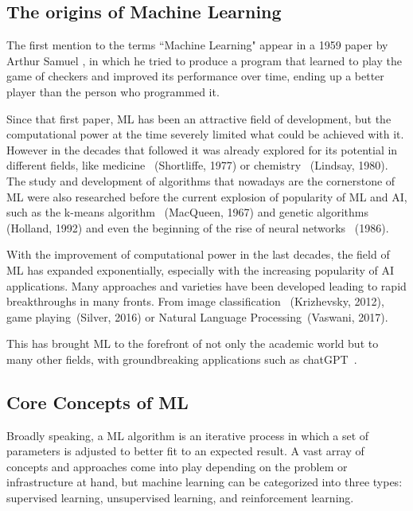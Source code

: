 \documentclass[a4paper, 11pt]{report}
\begin{document}
\subsection{The origins of Machine Learning} \label{Theory: ML}
The first mention to the terms ``Machine Learning" appear in a 1959 paper by Arthur Samuel \cite{samuel1969_ML_origin}, in which he tried to produce a program that learned to play the game of checkers and improved its performance over time, ending up a better player than the person who programmed it.

Since that first paper, ML has been an attractive field of development, but the computational power at the time severely limited what could be achieved with it. However in the decades that followed it was already explored for its potential in different fields, like medicine~\cite{Shortliffe1977_ML_medicine} (Shortliffe, 1977) or chemistry~\cite{Lindsay1980_ML_chemistry80} (Lindsay, 1980). The study and development of algorithms that nowadays are the cornerstone of ML were also researched before the current explosion of popularity of ML and AI, such as the k-means algorithm~\cite{MacQueen1967_Methods_Multivariate} (MacQueen, 1967) and genetic algorithms~\cite{Holland1992_Genetic_Alg} (Holland, 1992) and even the beginning of the rise of neural networks~\cite{Rumelhart1986_Backpropagation} (1986).

With the improvement of computational power in the last decades, the field of ML has expanded exponentially, especially with the increasing popularity of AI applications. Many approaches and varieties have been developed leading to rapid breakthroughs in many fronts. From image classification~\cite{Krizhevsky2012_AlexNet} (Krizhevsky, 2012), game playing~\cite{Silver2016_Go}(Silver, 2016) or Natural Language Processing~\cite{vaswani2023_Attention}(Vaswani, 2017).

This has brought ML to the forefront of not only the academic world but to many other fields, with groundbreaking applications such as chatGPT~\cite{GPTopenai}.

\subsection{Core Concepts of ML}
Broadly speaking, a ML algorithm is an iterative process in which a set of parameters is adjusted to better fit to an expected result. A vast array of concepts and approaches come into play depending on the problem or infrastructure at hand, but machine learning can be categorized into three types: supervised learning, unsupervised learning, and reinforcement learning.
\end{document}
